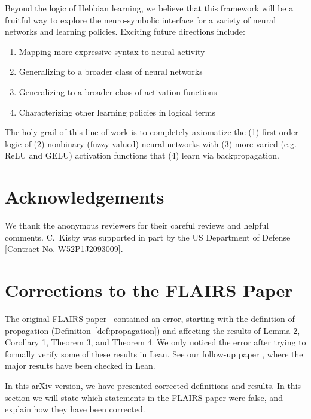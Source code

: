 \documentclass[letterpaper]{article}
\theoremstyle{definition}
\begin{document}
Beyond the logic of Hebbian learning, we believe that this framework will be a fruitful way to explore the neuro-symbolic interface for a variety of neural networks and learning policies.  Exciting future directions include:
\begin{enumerate}[itemsep=-1pt, topsep=2pt]
    \item Mapping more expressive syntax to neural activity
    \item Generalizing to a broader class of neural networks
    \item Generalizing to a broader class of activation functions
    \item Characterizing other learning policies in logical terms
\end{enumerate}
The holy grail of this line of work is to completely axiomatize the (1) first-order logic of (2) nonbinary (fuzzy-valued) neural networks with (3) more varied (e.g. ReLU and GELU) activation functions that (4) learn via backpropagation.

\section{Acknowledgements}
We thank the anonymous reviewers for their careful reviews and helpful comments.  C.~Kisby was supported in part by the US Department of Defense [Contract No. W52P1J2093009].

\section{Corrections to the FLAIRS Paper}
The original FLAIRS paper~\citep{kisby2022logic} contained an error, starting with the definition of propagation (Definition~\ref{def:propagation}) and affecting the results of Lemma 2, Corollary 1, Theorem 3, and Theorem 4. We only noticed the error after trying to formally verify some of these results in Lean. See our follow-up paper \citep{kisby2024hebbian}, where the major results have been checked in Lean.

In this arXiv version, we have presented corrected definitions and results. In this section we will state which statements in the FLAIRS paper were false, and explain how they have been corrected.
\end{document}
